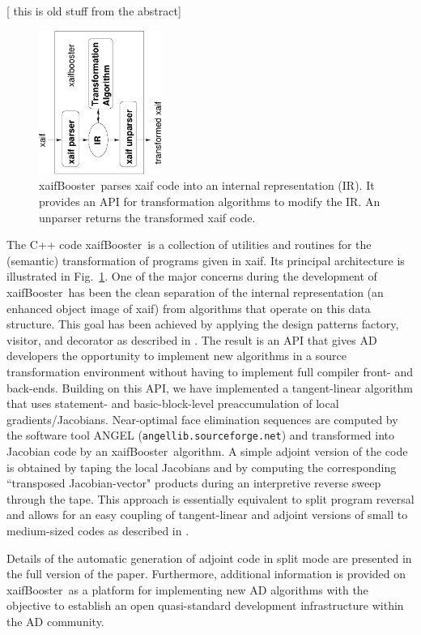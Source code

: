 \documentclass[11pt]{article}
\newcommand{\xaifBooster}{xaifBooster}
\newcommand{\reffig}[1]{{Fig.~\ref{#1}}}
\begin{document}
{\color{blue} [ this is old stuff from the abstract]  
\begin{figure}
\centering \includegraphics[width=4cm]{principle}
\caption{\xaifBooster\ parses xaif code into an internal representation (IR).
It provides an API for transformation algorithms to modify the IR. An unparser
returns the transformed xaif code.} \label{fig:xaifBooster}
\end{figure}
The C++ code \xaifBooster\ is a collection of utilities and routines for the
(semantic) transformation of programs given in xaif. Its principal architecture 
is illustrated in \reffig{fig:xaifBooster}. One of the major concerns during
the development of \xaifBooster\ has been the clean separation of the internal
representation (an enhanced object image of xaif) from algorithms that operate 
on this data structure. This goal has been achieved by applying the design 
patterns \cite{DesignPatterns} factory, visitor, and decorator as described in \cite{UtNa03}.
The result is an API that gives AD developers the opportunity
to implement new algorithms in a source transformation environment without
having to implement full compiler front- and back-ends. Building on
this API, we have implemented a tangent-linear algorithm that uses statement-
\cite{SEUpreacc} and basic-block-level preaccumulation of local 
gradients/Jacobians. Near-optimal face elimination \cite{ElimTechMP} sequences 
are computed by the software tool 
ANGEL \cite{AGN03,SAGA} ({\tt angellib.sourceforge.net}) and transformed into 
Jacobian code by
an \xaifBooster\ algorithm. A simple adjoint version of the code is obtained
by taping the local Jacobians 
and by computing the corresponding ``transposed Jacobian-vector" products 
during an interpretive reverse sweep through the tape. This approach is
essentially equivalent to split program reversal \cite{Gri00} and allows
for an easy coupling of tangent-linear and adjoint versions of small to 
medium-sized codes as described in \cite{NaHe03}. 

Details of the automatic generation of adjoint code in split mode are presented
in the full version of the paper. Furthermore, additional information is 
provided on \xaifBooster\ as a platform for implementing new AD algorithms with 
the objective to establish an open quasi-standard development infrastructure
within the AD community.
}
\end{document}
